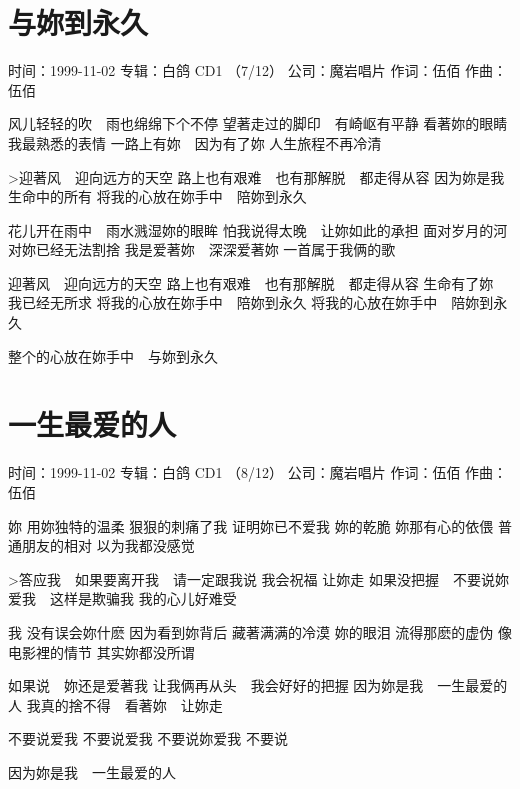 \documentclass[UTF8,a4paper,oneside,twocolumn,12pt]{ctexbook}
\newcommand{\infopair}[2]{\textbullet #1：#2}
\newcommand{\zc}[1][伍佰]{\infopair{作词}{#1}}
\newcommand{\zq}[1][伍佰]{\infopair{作曲}{#1}}
\newcommand{\zj}[1]{\infopair{专辑}{#1}}
\newcommand{\sj}[1]{\infopair{时间}{#1}}
\newcommand{\gs}[1]{\infopair{公司}{#1}}
\newenvironment{info}{\begin{flushleft}\kaishu
	}
	{\end{flushleft}\normalsize\yahei\par}
\newenvironment{lyric}{
	}
{}
\begin{document}
\section{与妳到永久}
\begin{info}
	\sj{1999-11-02}
	\zj{白鸽 CD1 （7/12）}
	\gs{魔岩唱片}
	\zc
	\zq
\end{info}
\begin{lyric}
	风儿轻轻的吹　雨也绵绵下个不停
	望著走过的脚印　有崎岖有平静
	看著妳的眼睛　我最熟悉的表情
	一路上有妳　因为有了妳
	人生旅程不再冷清

	>迎著风　迎向远方的天空
	路上也有艰难　也有那解脱　都走得从容
	因为妳是我　生命中的所有
	将我的心放在妳手中　陪妳到永久

	花儿开在雨中　雨水溅湿妳的眼眸
	怕我说得太晚　让妳如此的承担
	面对岁月的河　对妳已经无法割捨
	我是爱著妳　深深爱著妳
	一首属于我俩的歌

	迎著风　迎向远方的天空
	路上也有艰难　也有那解脱　都走得从容
	生命有了妳　我已经无所求
	将我的心放在妳手中　陪妳到永久
	将我的心放在妳手中　陪妳到永久

	整个的心放在妳手中　与妳到永久
\end{lyric}

\section{一生最爱的人}
\begin{info}
	\sj{1999-11-02}
	\zj{白鸽 CD1 （8/12）}
	\gs{魔岩唱片}
	\zc
	\zq
\end{info}
\begin{lyric}
	妳
	用妳独特的温柔
	狠狠的刺痛了我
	证明妳已不爱我
	妳的乾脆
	妳那有心的依偎
	普通朋友的相对
	以为我都没感觉

	>答应我　如果要离开我　请一定跟我说
	我会祝福  让妳走
	如果没把握　不要说妳爱我　这样是欺骗我
	我的心儿好难受

	我
	没有误会妳什麽
	因为看到妳背后
	藏著满满的冷漠
	妳的眼泪
	流得那麽的虚伪
	像电影裡的情节
	其实妳都没所谓

	如果说　妳还是爱著我
	让我俩再从头　我会好好的把握
	因为妳是我　一生最爱的人
	我真的捨不得　看著妳　让妳走

	不要说爱我
	不要说爱我
	不要说妳爱我
	不要说

	因为妳是我　一生最爱的人
\end{lyric}
\end{document}
